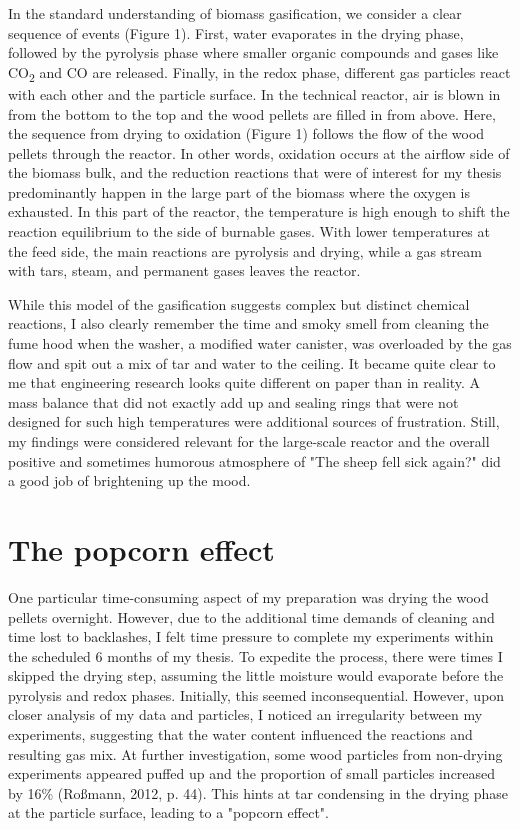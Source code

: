 \documentclass[authordate, anecdote]{jote-new-article}
\begin{document}
	In the standard understanding of biomass gasification, we consider a clear sequence of events (Figure 1). First, water evaporates in the drying phase, followed by the pyrolysis phase where smaller organic compounds and gases like CO\textsubscript{2} and CO are released. Finally, in the redox phase, different gas particles react with each other and the particle surface. In the technical reactor, air is blown in from the bottom to the top and the wood pellets are filled in from above. Here, the sequence from drying to oxidation (Figure 1) follows the flow of the wood pellets through the reactor. In other words, oxidation occurs at the airflow side of the biomass bulk, and the reduction reactions that were of interest for my thesis predominantly happen in the large part of the biomass where the oxygen is exhausted. In this part of the reactor, the temperature is high enough to shift the reaction equilibrium to the side of burnable gases. With lower temperatures at the feed side, the main reactions are pyrolysis and drying, while a gas stream with tars, steam, and permanent gases leaves the reactor.



	While this model of the gasification suggests complex but distinct chemical reactions, I also clearly remember the time and smoky smell from cleaning the fume hood when the washer, a modified water canister, was overloaded by the gas flow and spit out a mix of tar and water to the ceiling. It became quite clear to me that engineering research looks quite different on paper than in reality. A mass balance that did not exactly add up and sealing rings that were not designed for such high temperatures were additional sources of frustration. Still, my findings were considered relevant for the large-scale reactor and the overall positive and sometimes humorous atmosphere of "The sheep fell sick again?" did a good job of brightening up the mood.



	\section{The popcorn effect}



	One particular time-consuming aspect of my preparation was drying the wood pellets overnight. However, due to the additional time demands of cleaning and time lost to backlashes, I felt time pressure to complete my experiments within the scheduled 6 months of my thesis. To expedite the process, there were times I skipped the drying step, assuming the little moisture would evaporate before the pyrolysis and redox phases. Initially, this seemed inconsequential. However, upon closer analysis of my data and particles, I noticed an irregularity between my experiments, suggesting that the water content influenced the reactions and resulting gas mix. At further investigation, some wood particles from non-drying experiments appeared puffed up and the proportion of small particles increased by 16\% (Roßmann, 2012, p. 44). This hints at tar condensing in the drying phase at the particle surface, leading to a "popcorn effect".
\end{document}
